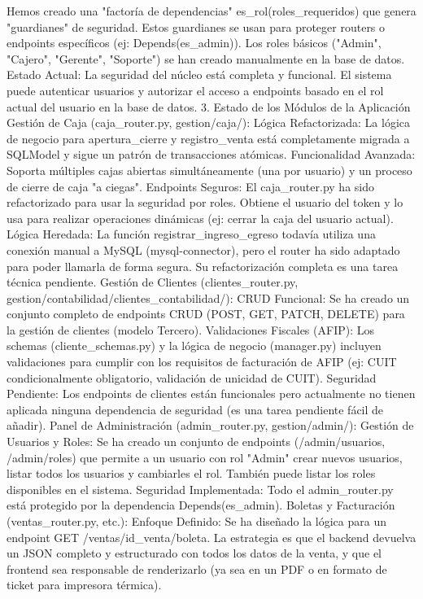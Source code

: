 Hemos creado una "factoría de dependencias" es_rol(roles_requeridos) que genera "guardianes" de seguridad. Estos guardianes se usan para proteger routers o endpoints específicos (ej: Depends(es_admin)).
Los roles básicos ("Admin", "Cajero", "Gerente", "Soporte") se han creado manualmente en la base de datos.
Estado Actual: La seguridad del núcleo está completa y funcional. El sistema puede autenticar usuarios y autorizar el acceso a endpoints basado en el rol actual del usuario en la base de datos.
3. Estado de los Módulos de la Aplicación
Gestión de Caja (caja_router.py, gestion/caja/):
Lógica Refactorizada: La lógica de negocio para apertura_cierre y registro_venta está completamente migrada a SQLModel y sigue un patrón de transacciones atómicas.
Funcionalidad Avanzada: Soporta múltiples cajas abiertas simultáneamente (una por usuario) y un proceso de cierre de caja "a ciegas".
Endpoints Seguros: El caja_router.py ha sido refactorizado para usar la seguridad por roles. Obtiene el usuario del token y lo usa para realizar operaciones dinámicas (ej: cerrar la caja del usuario actual).
Lógica Heredada: La función registrar_ingreso_egreso todavía utiliza una conexión manual a MySQL (mysql-connector), pero el router ha sido adaptado para poder llamarla de forma segura. Su refactorización completa es una tarea técnica pendiente.
Gestión de Clientes (clientes_router.py, gestion/contabilidad/clientes_contabilidad/):
CRUD Funcional: Se ha creado un conjunto completo de endpoints CRUD (POST, GET, PATCH, DELETE) para la gestión de clientes (modelo Tercero).
Validaciones Fiscales (AFIP): Los schemas (cliente_schemas.py) y la lógica de negocio (manager.py) incluyen validaciones para cumplir con los requisitos de facturación de AFIP (ej: CUIT condicionalmente obligatorio, validación de unicidad de CUIT).
Seguridad Pendiente: Los endpoints de clientes están funcionales pero actualmente no tienen aplicada ninguna dependencia de seguridad (es una tarea pendiente fácil de añadir).
Panel de Administración (admin_router.py, gestion/admin/):
Gestión de Usuarios y Roles: Se ha creado un conjunto de endpoints (/admin/usuarios, /admin/roles) que permite a un usuario con rol "Admin" crear nuevos usuarios, listar todos los usuarios y cambiarles el rol. También puede listar los roles disponibles en el sistema.
Seguridad Implementada: Todo el admin_router.py está protegido por la dependencia Depends(es_admin).
Boletas y Facturación (ventas_router.py, etc.):
Enfoque Definido: Se ha diseñado la lógica para un endpoint GET /ventas/{id_venta}/boleta. La estrategia es que el backend devuelva un JSON completo y estructurado con todos los datos de la venta, y que el frontend sea responsable de renderizarlo (ya sea en un PDF o en formato de ticket para impresora térmica).
